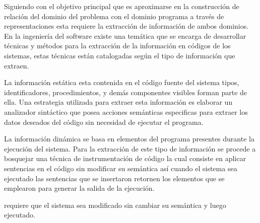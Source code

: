 \documentclass[12pt]{report}
\begin{document}
Siguiendo con el objetivo principal que es aproximarse en la construcción de relación del dominio del problema con el dominio programa a través de representaciones esta requiere la extracción de información de ambos dominios. En la ingeniería del software existe una temática que se encarga de desarrollar técnicas y métodos para la extracción de la información en códigos de los sistemas, estas técnicas están catalogadas según el tipo de información que extraen.

La información estática esta contenida en el código fuente del sistema 
tipos, identificadores, procedimientos, y demás componentes visibles forman parte de ella. Una estrategia utilizada para extraer esta información es elaborar un analizador sintáctico que posea acciones semánticas especificas para extraer los datos deseados del código sin necesidad de ejecutar el programa. 

La información dinámica se basa en elementos del programa presentes durante la ejecución del sistema. Para la extracción de este tipo de información se procede a bosquejar una técnica de instrumentación de código la cual consiste en aplicar sentencias en el código sin modificar su semántica así cuando el sistema sea ejecutado las sentencias que se insertaron retornen los elementos que se emplearon para generar la salida de la ejecución.


requiere que el sistema sea modificado sin cambiar su semántica y luego ejecutado.






\end{document}
